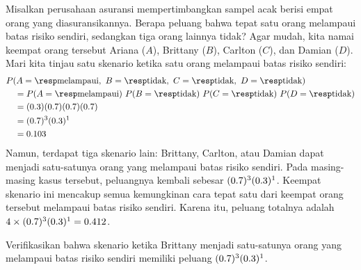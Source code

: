 \begin{examplewrap}
\begin{nexample}{Misalkan perusahaan asuransi mempertimbangkan
    sampel acak berisi empat orang yang diasuransikannya.
    Berapa peluang bahwa tepat satu orang melampaui batas risiko sendiri,
    sedangkan tiga orang lainnya tidak? Agar mudah, kita namai keempat
    orang tersebut Ariana ($A$), Brittany ($B$), Carlton ($C$), dan
    Damian ($D$).}
  \label{insureOneOfFourExceedsDeductible}%
  Mari kita tinjau satu skenario ketika satu orang melampaui batas risiko
  sendiri:
  \begin{align*}
  &P(A=\text{\insureF{}},
      \text{ }B=\text{\insureS{}},
      \text{ }C=\text{\insureS{}},
      \text{ }D=\text{\insureS{}}) \\
    &\quad = P(A=\text{\insureF{}})\ 
        P(B=\text{\insureS{}})\ 
        P(C=\text{\insureS{}})\ 
        P(D=\text{\insureS{}}) \\
    &\quad =  (\insureFprob{})
        (\insureSprob{})
        (\insureSprob{})
        (\insureSprob{}) \\
    &\quad = (\insureSprob{})^3 (\insureFprob{})^1 \\
    &\quad = \insureBinomCinDSingleScenario{}
  \end{align*}
  Namun, terdapat tiga skenario lain: Brittany, Carlton, atau Damian
  dapat menjadi satu-satunya orang yang melampaui batas risiko sendiri.
  Pada masing-masing kasus tersebut, peluangnya kembali sebesar
  $(0.7{})^3 (0.3{})^1$.
  Keempat skenario ini mencakup semua kemungkinan cara tepat satu dari
  keempat orang tersebut melampaui batas risiko sendiri. Karena itu,
  peluang totalnya adalah
  $4 \times (0.7{})^3 (0.3{})^1
      = 0.412{}$.
\end{nexample}
\end{examplewrap}

\begin{exercisewrap}
\begin{nexercise}
Verifikasikan bahwa skenario ketika Brittany menjadi satu-satunya orang
yang melampaui batas risiko sendiri memiliki peluang
$(0.7{})^3 (0.3{})^1$.~\footnotemark{}
\end{nexercise}
\end{exercisewrap}


